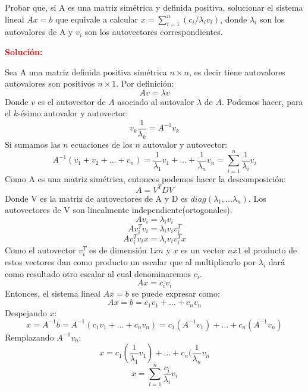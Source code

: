 Probar que, si A es una matriz simétrica y definida positiva, solucionar el sistema lineal $Ax = b$ que equivale a calcular $x = \sum_{i = 1}^{n}(c_{i}/\lambda_{i}v_{i})$, donde $\lambda_{i}$ son los autovalores de A y $v_{i}$ son los autovectores correspondientes.

\noindent \textcolor{red}{\bf Solución:}

Sea A una matriz definida positiva simétrica $n \times n$, es decir tiene autovalores autovalores son positivos $n \times 1$. Por definición: 
\begin{equation}
    A v = \lambda v     
\end{equation}
Donde $v$ es el autovector de $A$ asociado al autovalor $\lambda$  de $A$. Podemos hacer, para el $k$-ésimo autovalor y autovector:
\begin{equation}
    v_{k} \frac{1}{\lambda_{k}} = A^{-1}v_{k}    
\end{equation}
Si sumamos las $n$ ecuaciones de los $n$ autovalor y autovector:
\begin{equation}
    A^{-1}(v_{1} + v_{2} + \dots + v_{n}) =  \frac{1}{\lambda_{1}}v_{1} + \dots + \frac{1}{\lambda_{n}}v_{n} = \sum_{i = 1}^{n}\frac{1}{\lambda_{i}}v_{i}
\end{equation}
Como A es una matriz simétrica, entonces podemos hacer la descomposición:
\begin{equation}
    A = V^{T}DV
\end{equation}
Donde V es la matriz de autovectores de A y D es $diag(\lambda _{1}, ... \lambda _{n})$. Los autovectores de V son linealmente independiente(ortogonales). 
\[
    Av_{i} = \lambda_{i}v_{i} 
\]
\[
    Av_{i}^{T}v_{i} = \lambda_{i}v_{i}v_{i}^{T} 
\]
\[
    Av_{i}^{T}v_{i}x = \lambda_{i}v_{i}v_{i}^{T}x
\]
Como el autovector $v_{i}^{T}$ es de dimensión $1xn$ y $x$ es un vector $nx1$ el producto de estos vectores dan como producto un escalar que al multiplicarlo por $\lambda_{i}$ dará como resultado otro escalar al cual denominaremos $c_i$.
\[
    Ax = c_{i}v_{i}
\]
Entonces, el sistema lineal $Ax = b$  se puede expresar como:
\begin{equation}
    Ax = b = c_{1}v_{1} + \dots + c_{n}v_{n}
\end{equation}
Despejando $x$:
\begin{equation}
    x = A^{-1}b = A^{-1}(c_{1}v_{1} + \dots + c_{n}v_{n}) = c_{1}(A^{-1}v_{1}) + \dots + c_{n}(A^{-1}v_{n})
\end{equation}
Remplazando $A^{-1}v_{n}$:
\begin{equation}
    x = c_{1}(\frac{1}{\lambda_{1}}v_{1}) + \dots + c_{n}(\frac{1}{\lambda_{n}}v_{n}
\end{equation}
\begin{equation}
    x = \sum_{i = 1}^{n} \frac{c_{i}}{\lambda_{i}}v_{i}
\end{equation}
